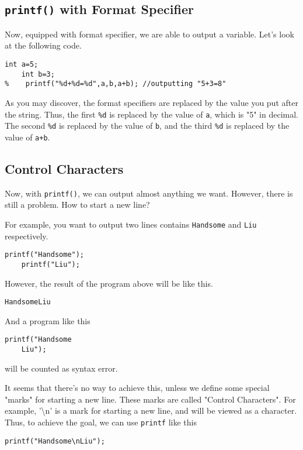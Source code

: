 \documentclass{report}
\newcommand{\bs}{\textbackslash}
\begin{document}
    \subsection{\texttt{printf()} with Format Specifier}
    Now, equipped with format specifier, we are able to output a variable. Let's look at the following code.
\begin{lstlisting}[style=CStyle]
    int a=5;
    int b=3;
%    printf("%d+%d=%d",a,b,a+b); //outputting "5+3=8" 
\end{lstlisting} 
    As you may discover, the format specifiers are replaced by the value you put after the string. Thus, the first \texttt{\%d} is replaced by the value of \texttt{a}, which is "5" in decimal. The second \texttt{\%d} is replaced by the value of \texttt{b}, and the third \texttt{\%d} is replaced by the value of \texttt{a+b}.

    \subsection{Control Characters}
    Now, with \texttt{printf()}, we can output almost anything we want. However, there is still a problem. How to start a new line?

    For example, you want to output two lines contains \texttt{Handsome} and \texttt{Liu} respectively.
\begin{lstlisting}[style=CStyle]
    printf("Handsome");
    printf("Liu");
\end{lstlisting}

    However, the result of the program above will be like this.
\begin{lstlisting}[style=CLstyle]
HandsomeLiu
\end{lstlisting}
    And a program like this
\begin{lstlisting}[style=CStyle]
    printf("Handsome
    Liu");
\end{lstlisting}
    will be counted as syntax error.

    It seems that there's no way to achieve this, unless we define some special "marks" for starting a new line. These marks are called "Control Characters". For example, '\bs n' is a mark for starting a new line, and will be viewed as a character. Thus, to achieve the goal, we can use \texttt{printf} like this

\begin{lstlisting}[style=CStyle]
    printf("Handsome\nLiu");
\end{lstlisting}
\end{document}
